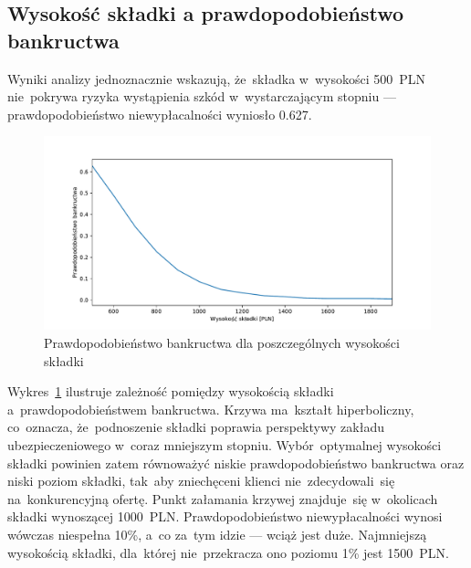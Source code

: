 \documentclass[12pt, a4paper, oneside]{mwart} %
\begin{document}
\subsection{Wysokość składki a prawdopodobieństwo bankructwa}
Wyniki analizy jednoznacznie wskazują, że~składka w~wysokości 500~PLN nie~pokrywa ryzyka wystąpienia szkód w~wystarczającym stopniu --- prawdopodobieństwo niewypłacalności wyniosło 0.627. 
\begin{figure}
\centering
\includegraphics[width = \textwidth]{n=1000/p_bankructwa.pdf}
\caption{Prawdopodobieństwo bankructwa dla poszczególnych wysokości składki}
\label{p_bankructwa_n1000}
\end{figure}
Wykres~\ref{p_bankructwa_n1000} ilustruje zależność pomiędzy wysokością składki a~prawdopodobieństwem bankructwa. Krzywa ma~kształt hiperboliczny, co~oznacza, że~podnoszenie składki poprawia perspektywy zakładu ubezpieczeniowego w~coraz mniejszym stopniu. Wybór~optymalnej wysokości składki powinien zatem równoważyć niskie prawdopodobieństwo bankructwa oraz niski poziom składki, tak~aby zniechęceni klienci nie~zdecydowali~się na~konkurencyjną ofertę. Punkt załamania krzywej znajduje~się w~okolicach składki wynoszącej 1000~PLN. Prawdopodobieństwo niewypłacalności wynosi wówczas niespełna 10\%, a~co za~tym idzie --- wciąż jest duże. Najmniejszą wysokością składki, dla~której nie~przekracza ono poziomu 1\% jest 1500~PLN.
\end{document}
